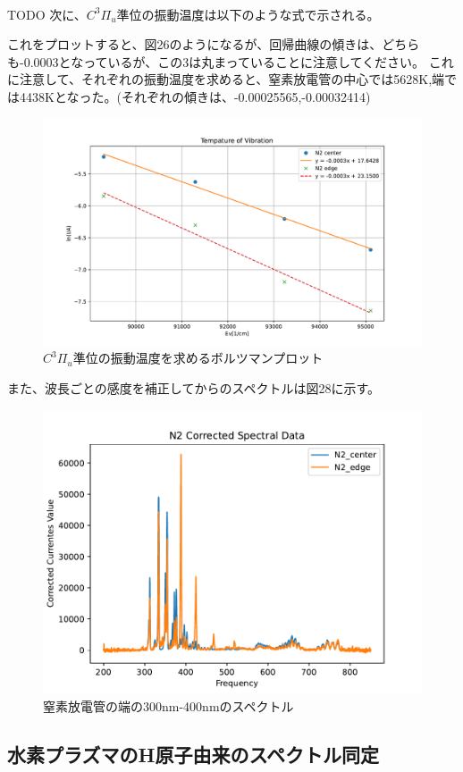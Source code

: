 \documentclass[a4j,twocolumn]{jsarticle}
\begin{document}
\\

TODO
次に、$C^3\varPi_u$準位の振動温度は以下のような式で示される。

これをプロットすると、図26のようになるが、回帰曲線の傾きは、どちらも-0.0003となっているが、この3は丸まっていることに注意してください。
これに注意して、それぞれの振動温度を求めると、窒素放電管の中心では5628K,端では4438Kとなった。(それぞれの傾きは、-0.00025565,-0.00032414)

\begin{figure}[htb]
    \centering
    \includegraphics[keepaspectratio,width=0.6\columnwidth]{fig/temp.pdf}
    \caption{$C^3\varPi_u$準位の振動温度を求めるボルツマンプロット}
\end{figure}



また、波長ごとの感度を補正してからのスペクトルは図28に示す。

\begin{figure}[htb]
    \centering
    \includegraphics[keepaspectratio,width=0.6\columnwidth]{fig/hahaha.pdf}
    \caption{窒素放電管の端の300nm-400nmのスペクトル}
\end{figure}





\subsection*{水素プラズマのH原子由来のスペクトル同定}
\end{document}
